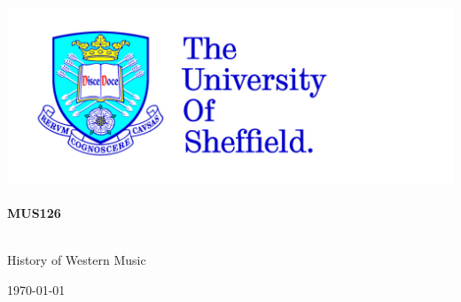 
\begin{titlepage}

\begin{center}



\includegraphics[scale=0.2]{tuoslogo_cmyk_hi} \\




\HRule \\[0.4cm]
{ \huge \bfseries MUS126}\\[0.4cm]

\HRule \\[1.5cm]

\begin{minipage}{0.6\textwidth}
\begin{flushleft} \large
History of Western Music\\
\end{flushleft}
\end{minipage}

\vfill

{\large \today}

\end{center}

\end{titlepage}
